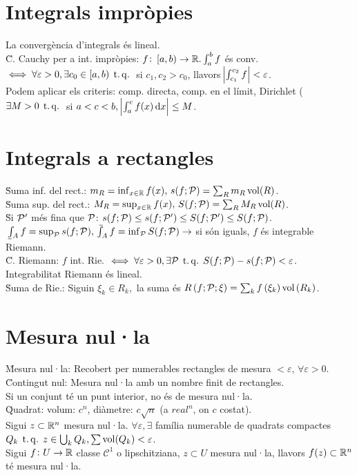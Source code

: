 \section{Integrals impròpies}

\ci La convergència d'integrals és lineal. \\
\u{C. Cauchy per a int. impròpies}: $f\colon \left[a, b\right) \to \mathbb{R}. \int_a^b f$ és conv. $\iff \forall \varepsilon > 0, \exists c_0 \in \left[a, b\right) \operatorname{\;t.q.\;}$ si $c_1, c_2 > c_0$, llavors $\abs{\int_{c_1}^{c_2} f} < \varepsilon$. \\
\ci Podem aplicar els criteris: comp. directa, comp. en el límit, Dirichlet ($\exists M>0 \operatorname{\;t.q.\;}$ si $a<c<b,\, \abs{\int_a^c f(x) \dif x} \leq M$.

\section{Integrals a rectangles}

\u{Suma inf. del rect.}: $m_R = \inf_{x\in\mathbb{R}} f(x), \, s(f; \mathcal{P}) = \sum_R m_R \operatorname{vol}(R)$. \\
\u{Suma sup. del rect.}: $M_R = \sup_{x\in\mathbb{R}} f(x), \, S(f; \mathcal{P}) = \sum_R M_R \operatorname{vol}(R)$. \\
\u{Si $\mathcal{P}'$ més fina que $\mathcal{P}$}: $s(f; \mathcal{P}) \leq s(f; \mathcal{P}') \leq S(f; \mathcal{P}') \leq S(f; \mathcal{P})$. \\
\ci $\lowint_A f = \sup_\Pa s(f; \Pa), \upint_A f = \inf_\Pa S(f; \Pa) \to$ si són iguals, $f$ és integrable Riemann.\\
\u{C. Riemann}: $f$ int. Rie. $\iff \forall \varepsilon>0, \exists\mathcal{P} \operatorname{\;t.q.\;} S(f;\mathcal{P}) - s(f;\mathcal{P}) < \varepsilon$.\\
\ci Integrabilitat Riemann és lineal. \\
\u{Suma de Rie.}: Siguin $\xi_k \in R_k,$ la suma és $R\left( f;\mathcal{P}; \xi\right) = \sum_k f\left( \xi_k\right) \operatorname{vol}\left( R_k\right)$.

\section{Mesura nul·la}

\u{Mesura nul·la}: Recobert per numerables rectangles de mesura $< \varepsilon, \, \forall \varepsilon > 0$. \\
\u{Contingut nul}: Mesura nul·la amb un nombre finit de rectangles. \\
\ci Si un conjunt té un punt interior, no és de mesura nul·la. \\
\u{Quadrat}: volum: $c^n$, diàmetre: $c\sqrt{n}$ (a $real^n$, on $c$ costat). \\
\ci Sigui $z \subset \mathbb{R}^n$ mesura nul·la. $\forall \varepsilon, \exists$ família numerable de quadrats compactes $Q_k \operatorname{\;t.q.\;} z\in\bigcup_k Q_k, \sum\operatorname{vol}(Q_k) < \varepsilon$. \\
\ci Sigui $f\colon U\to \mathbb{R}$ classe $\mathcal{C}^1$ o lipschitziana, $z \subset U$ mesura nul·la, llavors $f(z) \subset \mathbb{R}^n$ té mesura nul·la.

